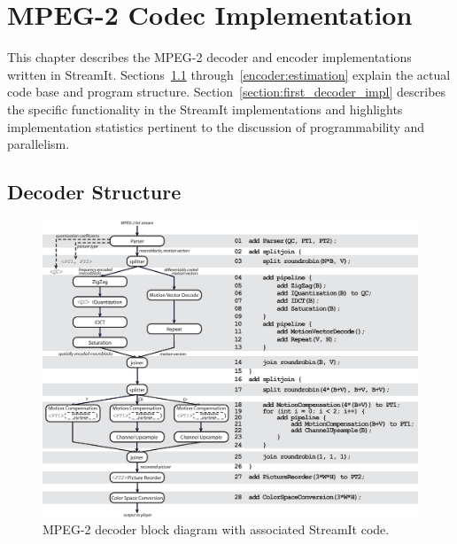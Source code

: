 \chapter{MPEG-2 Codec Implementation}
\label{chapter:decoder}

This chapter describes the MPEG-2 decoder and encoder 
implementations written in StreamIt. 
Sections~\ref{decoder_in_streamit} through~\ref{encoder:estimation} explain 
the actual code base and program structure. 
Section~\ref{section:first_decoder_impl} describes the 
specific functionality in the StreamIt implementations
and highlights implementation statistics pertinent to 
the discussion of programmability and parallelism.

\section{Decoder Structure}
\label{decoder_in_streamit}

\begin{figure}[h]
  \begin{center}
    \includegraphics[scale=0.44, angle=0]{./decoder_with_code.eps}
    \caption{MPEG-2 decoder block diagram with associated StreamIt code.}
    \label{fig:dec-with-code}
  \end{center}
\end{figure}

